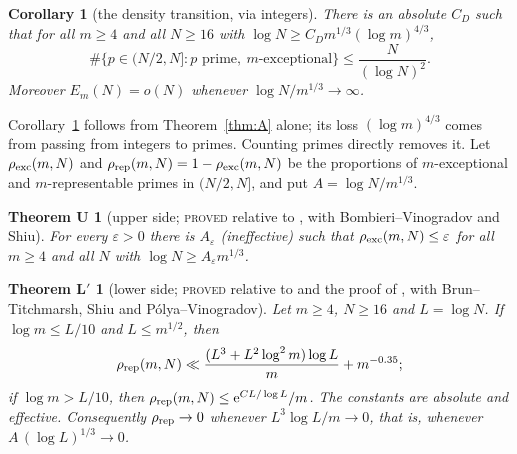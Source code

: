 \documentclass[10pt,reqno]{amsart}
\newtheorem{introcor}[introthm]{Corollary}
\newtheorem*{thmU}{Theorem U}
\newtheorem*{thmL}{Theorem L$'$}
\theoremstyle{definition}
\newcommand{\e}{\mathrm e}
\newcommand{\status}[1]{\textup{\textsc{#1}}}
\begin{document}
\begin{introcor}[the density transition, via integers]\label{cor:D}
There is an absolute $C_D$ such that for all $m\geq4$ and all $N\geq16$
with $\log N\geq C_Dm^{1/3}(\log m)^{4/3}$,
\[
 \#\{p\in(N/2,N]:p\text{ prime},\ m\text{-exceptional}\}
 \leq\frac N{(\log N)^2}.
\]
Moreover $E_m(N)=o(N)$ whenever $\log N/m^{1/3}\to\infty$.
\end{introcor}

Corollary~\ref{cor:D} follows from Theorem~\ref{thm:A} alone; its loss
$(\log m)^{4/3}$ comes from passing from integers to primes.  Counting
primes directly removes it.  Let $\rho_{\rm exc}(m,N)$ and
$\rho_{\rm rep}(m,N)=1-\rho_{\rm exc}(m,N)$ be the proportions of
$m$-exceptional and $m$-representable primes in $(N/2,N]$, and put
$A=\log N/m^{1/3}$.

\begin{thmU}[upper side; \status{proved} relative to \cite{TQ}, with Bombieri--Vinogradov and Shiu]
For every $\varepsilon>0$ there is $A_\varepsilon$ \textup{(}ineffective\textup{)}
such that $\rho_{\rm exc}(m,N)\leq\varepsilon$ for all $m\geq4$ and all
$N$ with $\log N\geq A_\varepsilon m^{1/3}$.
\end{thmU}

\begin{thmL}[lower side; \status{proved} relative to {\cite[Thm.~7.1]{ET}} and the proof of {\cite[Prop.~1.4]{ET}}, with Brun--Titchmarsh, Shiu and P\'olya--Vinogradov]
Let $m\geq4$, $N\geq16$ and $L=\log N$.  If $\log m\leq L/10$ and
$L\leq m^{1/2}$, then
\[
 \rho_{\rm rep}(m,N)\ll\frac{(L^3+L^2\log^2m)\log L}{m}
 +m^{-0.35};
\]
if $\log m>L/10$, then $\rho_{\rm rep}(m,N)\leq\e^{CL/\log L}/m$.  The
constants are absolute and effective.  Consequently
$\rho_{\rm rep}\to0$ whenever $L^3\log L/m\to0$, that is, whenever
$A\,(\log L)^{1/3}\to0$.
\end{thmL}
\end{document}
